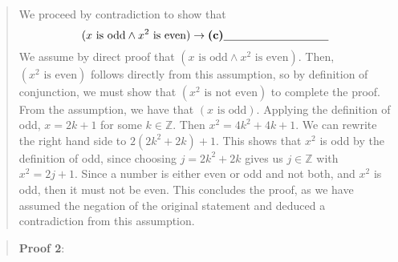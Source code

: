 \documentclass[12pt, oneside]{article}
\begin{document}
\begin{enumerate}
\begin{enumerate}
\begin{quote}
We proceed by contradiction to show that $$(x \textrm{ is odd} \land x^2 \textrm{ is even}) \to \textbf{(c)}\underline{\phantom{\hspace{1.3in}}}$$
We assume by direct proof that $(x \textrm{ is odd} \land x^2 \textrm{ is even})$. Then, $(x^2 \textrm{ is even})$ follows directly from this assumption, so by definition 
of conjunction, we must show that $(x^2 \textrm{ is not even})$ to complete the proof.
From the assumption, we have that $(x \textrm{ is odd})$.  Applying the definition of odd, $x = 2k + 1$ for some $k \in \mathbb{Z}$. Then $x^2 = 4k^2 + 4k + 1$. We can rewrite the right hand side to $2(2k^2 + 2k) + 1$. This shows that $x^2$ is odd by the definition of odd, since choosing $j = 2k^2 + 2k$ gives us $j \in \mathbb{Z}$ with $x^2 = 2j + 1$. Since a number is either even or odd and not both, and $x^2$ is odd, then it must not be even. 
This concludes the proof, as we have assumed the negation of the original statement and deduced a contradiction
from this assumption.
\end{quote}

\newpage
\begin{quote}{\bf Proof 2}: 


\end{quote}
\end{enumerate}
\end{enumerate}
\end{document}
